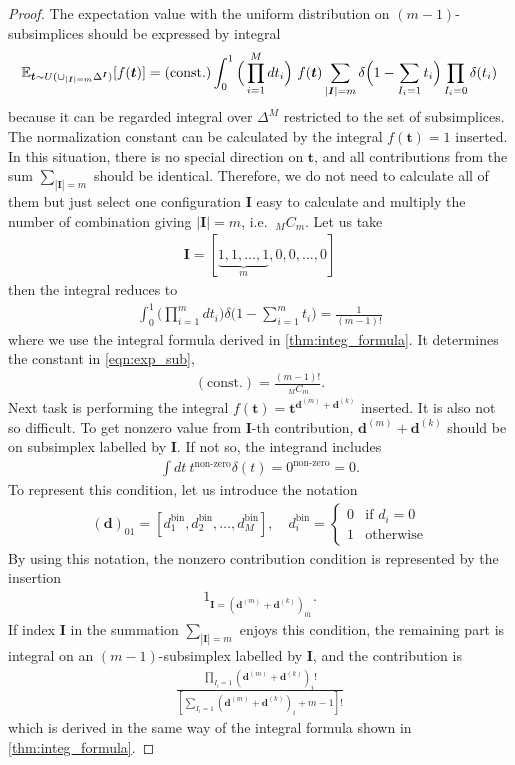 \documentclass{article}
\begin{document}
\begin{proof}
The expectation value with the uniform distribution on $(m-1)$-subsimplices should be expressed by integral
\begin{align}
\mathbb{E}_{\bm t \sim U(\cup_{|\bm I|=m} \Delta^{\bm I})} [ f(\bm t) ]
=
(\text{const.})
\int_{0}^1 \Big( 
\prod_{i=1}^M dt_i
\Big)
\ f(\bm t)
\sum_{|\bm I| = m}
\delta \Big(
1 - \sum_{I_i =1} t_i
\Big)
\prod_{I_i =0}
\delta (t_i)
\label{eqn:exp_sub}
\end{align}
because it can be regarded integral over $\Delta^{M}$ restricted to the set of subsimplices.
The normalization constant can be calculated by the integral $f(\bm t) = 1$ inserted.
In this situation, there is no special direction on $\bm t$, and all contributions from the sum $\sum_{|\bm I|=m}$ should be identical.
Therefore, we do not need to calculate all of them but just select one configuration $\bm I$ easy to calculate and multiply the number of combination giving $|\bm I|=m$, i.e. $\ _M C_m$.
Let us take
\begin{align}
\bm I = [\underbrace{1,1, \dots, 1}_{m}, 0, 0, \dots, 0]
\end{align}
then the integral reduces to
\begin{align}
\int_{0}^1 \Big( 
\prod_{i=1}^m dt_i
\Big)
\delta \Big(
1 - \sum_{i=1}^m t_i
\Big)
=
\frac{1}{(m-1)!}
\end{align}
where we use the integral formula derived in \ref{thm:integ_formula}.
It determines the constant in \cref{eqn:exp_sub}, 
\begin{align}
(\text{const.})
=
\frac{(m-1)!}{\ _M C_m}
.
\end{align}
Next task is performing the integral $f(\bm t) = \bm t^{\bm d^{(m)} + \bm d^{(k)}}$ inserted.
It is also not so difficult.
To get nonzero value from $\bm I$-th contribution, $\bm d^{(m)} + \bm d^{(k)}$ should be on subsimplex labelled by $\bm I$.
If not so, the integrand includes
\begin{align}
\int dt \
t^\text{non-zero}
\delta(t)
=
0^\text{non-zero}
=0.
\end{align}
To represent this condition, let us introduce the notation
\begin{align}
(\bm d)_{01}
=
[d^\mathrm{bin}_1, d^\mathrm{bin}_2, \dots, d^\mathrm{bin}_M],
\quad
d^\mathrm{bin}_i
=
\begin{cases}
0 & \text{if $d_i = 0$}\\
1 & \text{otherwise}
\end{cases}
\end{align}
By using this notation, the nonzero contribution condition is represented by the insertion
\begin{align}
1_{\bm I = (\bm d^{(m)} + \bm d^{(k)})_{01} }.
\end{align}
If index $\bm I$ in the summation $\sum_{|\bm I| = m}$ enjoys this condition, the remaining part is integral on an $(m-1)$-subsimplex labelled by $\bm I$, and the contribution is
\begin{align}
\frac{\prod_{I_i=1} (\bm d^{(m)} + \bm d^{(k)})_i ! }{
[
\sum_{I_i=1}(\bm d^{(m)} + \bm d^{(k)})_i + m -1 ]!
}
\end{align}
which is derived in the same way of the integral formula shown in \ref{thm:integ_formula}.
\end{proof}
\end{document}
